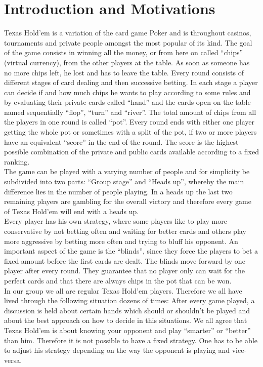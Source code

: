 \documentclass[11pt]{article}
\begin{document}
\section{Introduction and Motivations}

Texas Hold’em is a variation of the card game Poker and is throughout casinos, tournaments and private people amongst the most popular of its kind. The goal of the game consists in winning all the money, or from here on called “chips” (virtual currency), from the other players at the table. As soon as someone has no more chips left, he lost and has to leave the table.
Every round consists of different stages of card dealing and then successive betting. In each stage a player can decide if and how much chips he wants to play according to some rules and by evaluating their private cards called “hand” and the cards open on the table named sequentially “flop”, “turn” and “river”.
The total amount of chips from all the players in one round is called “pot”. Every round ends with either one player getting the whole pot or sometimes with a split of the pot, if two or more players have an equivalent “score” in the end of the round. The score is the highest possible combination of the private and public cards available according to a fixed ranking.
\\
The game can be played with a varying number of people and for simplicity be subdivided into two parts: “Group stage” and “Heads up”, whereby the main difference lies in the number of people playing. In a heads up the last two remaining players are gambling for the overall victory and therefore every game of Texas Hold’em will end with a heads up.
\\
Every player has his own strategy, where some players like to play more conservative by not betting often and waiting for better cards and others play more aggressive by betting more often and trying to bluff his opponent. An important aspect of the game is the “blinds”, since they force the players to bet a fixed amount before the first cards are dealt. The blinds move forward by one player after every round. They guarantee that no player only can wait for the perfect cards and that there are always chips in the pot that can be won.
\\							
In our group we all are regular Texas Hold’em players. Therefore we all have lived through the following situation dozens of times: After every game played, a discussion is held about certain hands which should or shouldn’t be played and about the best approach on how to decide in this situations. We all agree that Texas Hold’em is about knowing your opponent and play “smarter” or “better” than him. Therefore it is not possible to have a fixed strategy. One has to be able to adjust his strategy depending on the way the opponent is playing and vice-versa.
\end{document}
